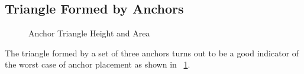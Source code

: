 \subsection{Triangle Formed by Anchors}

\begin{figure}
  \centering
    \caption{Anchor Triangle Height and Area}
    \label{fig:TriangleAreaHeight1}
\end{figure}

The triangle formed by a set of three anchors turns out to be a good indicator of the worst case of anchor placement as shown in ~\ref{fig:TriangleAreaHeight1}.
